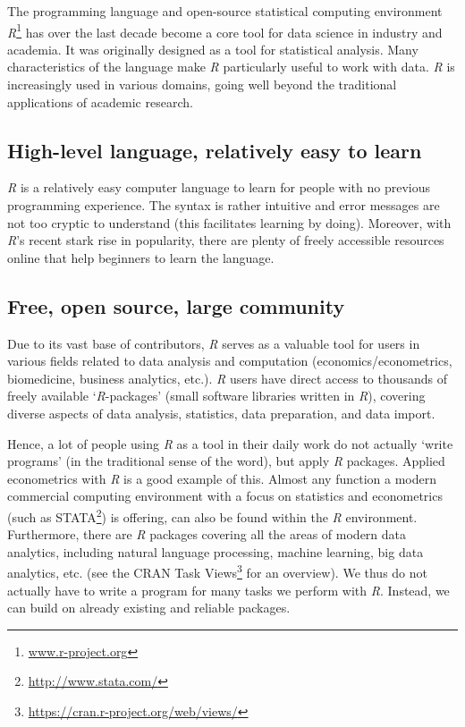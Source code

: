 \documentclass[
  12pt,
]{style/krantz}
\renewcommand{\href}[2]{#2\footnote{\url{#1}}}
\begin{document}
The programming language and open-source statistical computing environment \href{www.r-project.org}{\emph{R}} has over the last decade become a core tool for data science in industry and academia. It was originally designed as a tool for statistical analysis. Many characteristics of the language make \emph{R} particularly useful to work with data. \emph{R} is increasingly used in various domains, going well beyond the traditional applications of academic research.

\hypertarget{high-level-language-relatively-easy-to-learn}{%
\subsection{High-level language, relatively easy to learn}\label{high-level-language-relatively-easy-to-learn}}

\emph{R} is a relatively easy computer language to learn for people with no previous programming experience. The syntax is rather intuitive and error messages are not too cryptic to understand (this facilitates learning by doing). Moreover, with \emph{R}'s recent stark rise in popularity, there are plenty of freely accessible resources online that help beginners to learn the language.

\hypertarget{free-open-source-large-community}{%
\subsection{Free, open source, large community}\label{free-open-source-large-community}}

Due to its vast base of contributors, \emph{R} serves as a valuable tool for users in various fields related to data analysis and computation (economics/econometrics, biomedicine, business analytics, etc.). \emph{R} users have direct access to thousands of freely available `\emph{R}-packages' (small software libraries written in \emph{R}), covering diverse aspects of data analysis, statistics, data preparation, and data import.

Hence, a lot of people using \emph{R} as a tool in their daily work do not actually `write programs' (in the traditional sense of the word), but apply \emph{R} packages. Applied econometrics with \emph{R} is a good example of this. Almost any function a modern commercial computing environment with a focus on statistics and econometrics (such as \href{http://www.stata.com/}{STATA}) is offering, can also be found within the \emph{R} environment. Furthermore, there are \emph{R} packages covering all the areas of modern data analytics, including natural language processing, machine learning, big data analytics, etc. (see the \href{https://cran.r-project.org/web/views/}{CRAN Task Views} for an overview). We thus do not actually have to write a program for many tasks we perform with \emph{R}. Instead, we can build on already existing and reliable packages.
\end{document}
